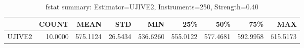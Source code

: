 \begin{table}[ht]
\centering
\caption{fstat summary: Estimator=UJIVE2, Instruments=250, Strength=0.40}
\begin{tabular}{lrrrrrrrr}
\toprule
 & COUNT & MEAN & STD & MIN & 25\% & 50\% & 75\% & MAX \\
\midrule
UJIVE2 & 10.0000 & 575.1124 & 26.5434 & 536.6260 & 555.0122 & 577.4681 & 592.9958 & 615.5173 \\
\bottomrule
\end{tabular}
\end{table}

